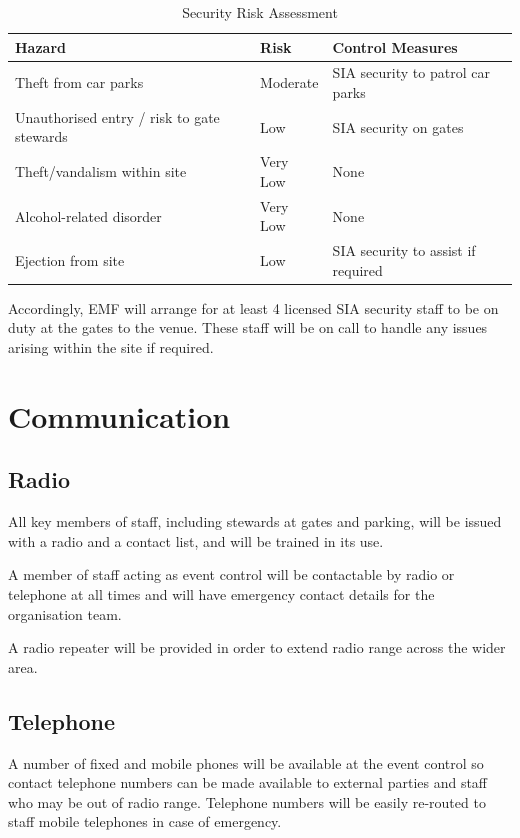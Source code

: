 \begin{table}[h!]
    \caption{Security Risk Assessment}
    \label{table:security}
    \centering
    \begin{tabular}{| l l l |}
        \hline
        \textbf{Hazard}                            & \textbf{Risk} & \textbf{Control Measures}          \\
        \hline
        Theft from car parks                       & Moderate      & SIA security to patrol car parks   \\
        Unauthorised entry / risk to gate stewards & Low           & SIA security on gates              \\
        Theft/vandalism within site                & Very Low      & None                               \\
        Alcohol-related disorder                   & Very Low      & None                               \\
        Ejection from site                         & Low           & SIA security to assist if required \\
        \hline
    \end{tabular}
\end{table}

Accordingly, EMF will arrange for at least 4 licensed SIA security staff to be on duty at the gates to the
venue. These staff will be on call to handle any issues arising within the site if required.
\newpage
\section{Communication}

\subsection{Radio}
All key members of staff, including stewards at gates and parking,
will be issued with a radio and a contact list, and will be trained in its use.

A member of staff acting as event control will be contactable by
radio or telephone at all times and will have emergency contact details for the
organisation team.

A radio repeater will be provided in order to extend radio range across the wider
area.

\subsection{Telephone}
A number of fixed and mobile phones will be available at the event control so
contact telephone numbers can be made available to external parties and staff
who may be out of radio range. Telephone numbers will be easily re-routed to
staff mobile telephones in case of emergency.

